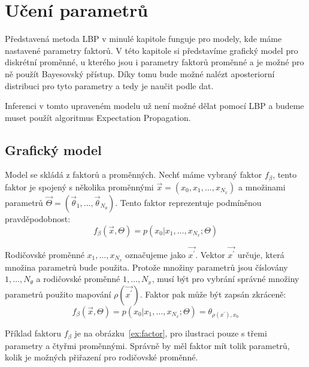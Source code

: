 \chapter{Učení parametrů}
\label{ch:ep}

Představená metoda LBP v minulé kapitole funguje pro modely, kde máme nastavené parametry faktorů.
V této kapitole si představíme grafický model pro diskrétní proměnné, u kterého jsou i parametry faktorů proměnné a je možné pro ně použít Bayesovský přístup.
Díky tomu bude možné nalézt aposteriorní distribuci pro tyto parametry a tedy je naučit podle dat.

Inferenci v tomto upraveném modelu už není možné dělat pomocí LBP a budeme muset použít algoritmus Expectation Propagation.

\section{Grafický model}

Model se skládá z faktorů a proměnných.
Nechť máme vybraný faktor $f_\beta$, tento faktor je spojený s několika proměnnými
$\vec{x} = (x_0, x_1, \dots, x_{N_x})$
a množinami parametrů
$\vec{\Theta} = (\vec{\theta}_1, \dots, \vec{\theta}_{N_\theta})$.
Tento faktor reprezentuje podmíněnou pravděpodobnost:
$$f_\beta(\vec{x}, \Theta) = p(x_0 | x_1, \dots, x_{N_x}; \Theta)$$

Rodičovské proměnné $x_1, \dots, x_{N_x}$ označujeme jako $\vec{x^\prime}$.
Vektor $\vec{x^\prime}$ určuje, která množina parametrů bude použita.
Protože množiny parametrů jsou číslovány $1, \dots, N_\theta$ a rodičovské
proměnné $1, \dots, N_x$, musí být pro vybrání správné množiny parametrů
použito mapování $\rho(\vec{x^\prime})$.
Faktor pak může být zapsán zkráceně:
$$f_\beta(\vec{x}, \Theta) = p(x_0 | x_1, \dots, x_{N_x}; \Theta) =
\theta_{\rho(x^\prime), x_0}$$

Příklad faktoru $f_\beta$ je na obrázku~\ref{ex:factor}, pro ilustraci pouze s třemi parametry a čtyřmi proměnnými.
Správně by měl faktor mít tolik parametrů, kolik je možných přiřazení pro rodičovské proměnné.

